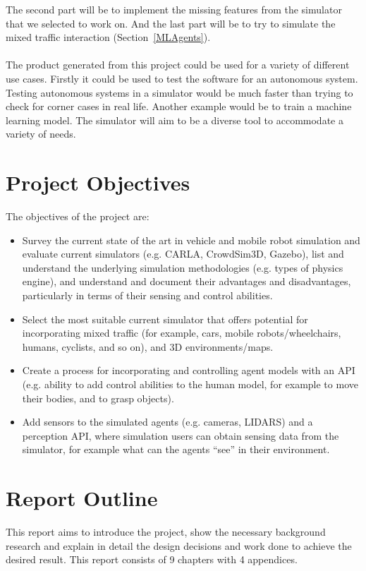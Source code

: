 The second part will be to implement the missing features from the simulator that we selected to work on.
And the last part will be to try to simulate the mixed traffic interaction (Section~\ref{MLAgents}).
\\~\\ 
The product generated from this project could be used for a variety of different use cases. Firstly it could be used to test the software for an autonomous system. Testing autonomous systems in a simulator would be much faster than trying to check for corner cases in real life. Another example would be to train a machine learning model. The simulator will aim to be a diverse tool to accommodate a variety of needs. 

\section{Project Objectives} \label{ProjectSpec}\label{Objectives}
The objectives of the project are: 
\begin{itemize}
    \item Survey the current state of the art in vehicle and mobile robot simulation and evaluate current simulators (e.g. CARLA, CrowdSim3D, Gazebo), list and understand the underlying simulation methodologies (e.g. types of physics engine), and understand and document their advantages and disadvantages, particularly in terms of their sensing and control abilities.
    \item Select the most suitable current simulator that offers potential for incorporating mixed traffic (for example, cars, mobile robots/wheelchairs, humans, cyclists, and so on), and 3D environments/maps.
    \item Create a process for incorporating and controlling agent models with an API (e.g. ability to add control abilities to the human model, for example to move their bodies, and to grasp objects).
    \item Add sensors to the simulated agents (e.g. cameras, LIDARS) and a perception API, where simulation users can obtain sensing data from the simulator, for example what can the agents “see” in their environment.
\end{itemize}





\section{Report Outline}
This report aims to introduce the project, show the necessary background research and explain in detail the design decisions and work done to achieve the desired result. This report consists of 9 chapters with 4 appendices. 

